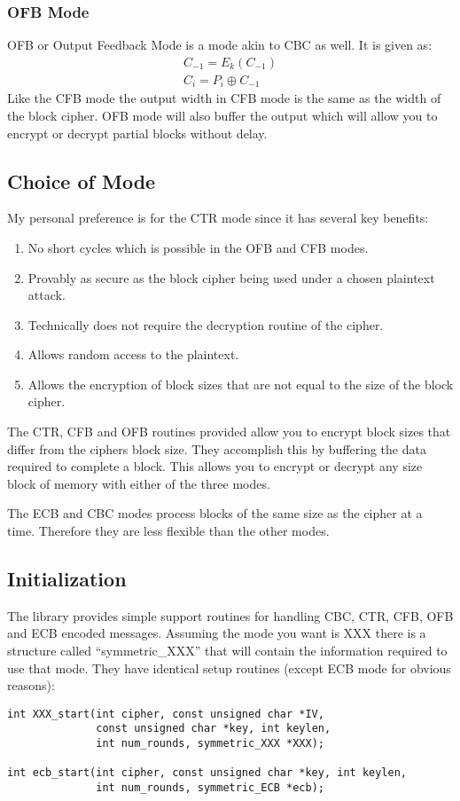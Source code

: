 \documentclass[a4paper]{book}
\begin{document}
\subsubsection{OFB Mode}
OFB or Output Feedback Mode is a mode akin to CBC as well.  It is given as:
\begin{eqnarray}
C_{-1} = E_k(C_{-1}) \nonumber \\
C_i = P_i \oplus C_{-1}
\end{eqnarray}
Like the CFB mode the output width in CFB mode is the same as the width of the block cipher.  OFB mode will also
buffer the output which will allow you to encrypt or decrypt partial blocks without delay.

\subsection{Choice of Mode}
My personal preference is for the CTR mode since it has several key benefits:
\begin{enumerate}
   \item No short cycles which is possible in the OFB and CFB modes.
   \item Provably as secure as the block cipher being used under a chosen plaintext attack.
   \item Technically does not require the decryption routine of the cipher.
   \item Allows random access to the plaintext.
   \item Allows the encryption of block sizes that are not equal to the size of the block cipher.
\end{enumerate}
The CTR, CFB and OFB routines provided allow you to encrypt block sizes that differ from the ciphers block size.  They 
accomplish this by buffering the data required to complete a block.  This allows you to encrypt or decrypt any size 
block of memory with either of the three modes.

The ECB and CBC modes process blocks of the same size as the cipher at a time.  Therefore they are less flexible than the
other modes.

\subsection{Initialization}
 
 
The library provides simple support routines for handling CBC, CTR, CFB, OFB and ECB encoded messages.  Assuming the mode 
you want is XXX there is a structure called ``symmetric\_XXX'' that will contain the information required to
use that mode.  They have identical setup routines (except ECB mode for obvious reasons):
    
\begin{verbatim}
int XXX_start(int cipher, const unsigned char *IV, 
              const unsigned char *key, int keylen, 
              int num_rounds, symmetric_XXX *XXX);

int ecb_start(int cipher, const unsigned char *key, int keylen, 
              int num_rounds, symmetric_ECB *ecb);
\end{verbatim}
\end{document}
